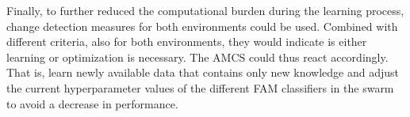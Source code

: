 Finally, to further reduced the computational burden during the learning process, change detection measures for both environments could be used.
Combined with different criteria, also for both environments, they would indicate is either learning or optimization is necessary.
The AMCS could thus react accordingly.
That is, learn newly available data that contains only new knowledge and adjust the current hyperparameter values of the different FAM classifiers in the swarm to avoid a decrease in performance.